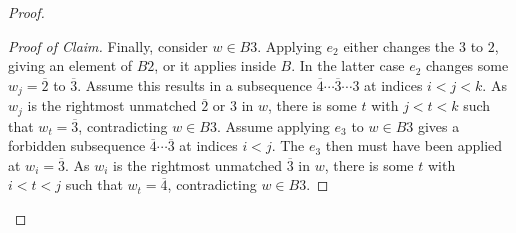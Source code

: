 \documentclass{amsart}
\theoremstyle{definition}
\theoremstyle{remark}
\numberwithin{equation}{section}
\begin{document}
\begin{proof}
\begin{proof}[Proof of Claim]
Finally, consider $w \in B3$. Applying $e_2$ either changes the $3$ to $2$, giving an element of $B2$, or it applies inside $B$. In the latter case $e_2$ changes some $w_j=\overline{2}$ to $\overline{3}$. Assume this results in a subsequence $\overline{4}\cdots \overline{3}\cdots 3$ at indices $i < j < k$. As $w_j$ is the rightmost unmatched $\overline{2}$ or $3$ in $w$, there is some $t$ with $j<t<k$ such that $w_t=\overline{3}$, contradicting $w\in B3$.
Assume applying $e_3$ to $w \in B3$ gives a forbidden subsequence $\overline{4}\cdots\overline{3}$ at indices $i < j$. The $e_3$ then must have been applied at $w_i=\overline{3}$. As $w_i$ is the rightmost unmatched $\overline{3}$ in $w$, there is some $t$ with $i<t<j$ such that $w_t=\overline{4}$, contradicting $w\in B3$.
\end{proof}


\end{proof}
\end{document}

